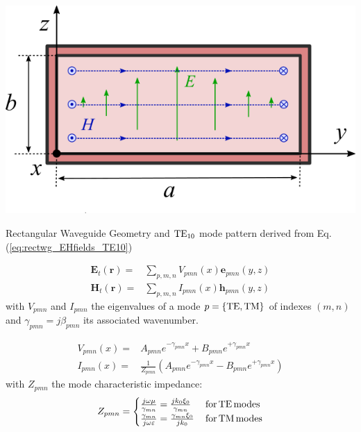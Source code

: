 \begin{marginfigure}[0cm]
	\includegraphics[width=1\linewidth]{figures/chap3/rectangular_waveguide_fields}
	\caption{Rectangular Waveguide Geometry and ${\mathrm{TE}}_{10}$ mode pattern derived from Eq.(\ref{eq:rectwg_EHfields_TE10})}
	\label{fig:rectangular_waveguide_geometry_fields}
\end{marginfigure}

\begin{subequations}
	\begin{align}
\mathbf{E}_{t}(\mathbf{r}) = & \sum_{p,m,n} V_{pmn}(x)\mathbf{e}_{pmn} (y,z)
\label{eq:E_guides_somme_modes}\\
\mathbf{H}_{t}(\mathbf{r}) = & \sum_{p,m,n} I_{pmn}(x)\mathbf{h}_{pmn} (y,z)
\label{eq:H_guides_somme_modes}
	\end{align}
\label{eq:rectwg_transverse_fields_sum_modes}
\end{subequations}
with $V_{pmn}$ and $I_{pmn}$ the eigenvalues of a mode $p=\{{\mathrm{TE}},{\mathrm{TM}}\}$ of indexes $(m,n)$ and $\gamma_{pmn}=j\beta_{pmn}$ its associated wavenumber. 

\begin{subequations}
	\begin{align}
V_{pmn}(x) = & A_{pmn}e^{-\gamma_{pmn}x} + B_{pmn}e^{+\gamma_{pmn}x}
\label{eq:valeur_propre_V}\\
I_{pmn}(x) = & \frac{1}{Z_{pmn}}\left(A_{pmn}e^{-\gamma_{pmn}x} - B_{pmn}e^{+\gamma_{pmn}x}\right)
\label{eq:valeur_propre_I}
	\end{align}
	 \label{eq:rectwg_modes_eigenvalues}
\end{subequations}
with $Z_{pmn}$ the mode characteristic impedance:
\begin{equation}
Z_{pmn} = 
\begin{cases}
\frac{j\omega\mu}{\gamma_{mn}} = \frac{j k_0 \xi_0}{\gamma_{mn}} & \mathrm{\, for\, {\mathrm{TE}}\, modes}\\
\frac{\gamma_{mn}}{j\omega\varepsilon}=\frac{\gamma_{mn} \xi_0}{j k_0} & \mathrm{\, for\,{\mathrm{TM}}\, modes}
\end{cases}
\end{equation}

